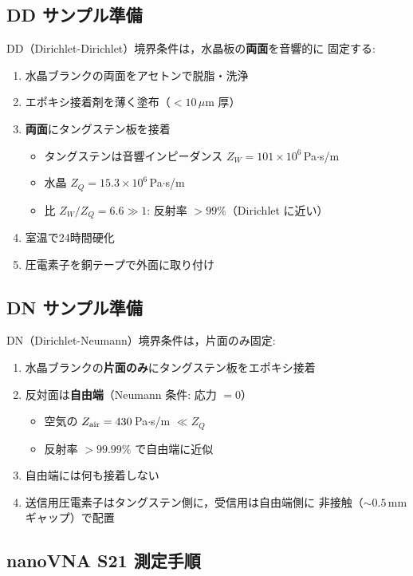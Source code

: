 \subsection{DD サンプル準備}

DD（Dirichlet-Dirichlet）境界条件は，水晶板の\textbf{両面}を音響的に
固定する:

\begin{enumerate}
\item 水晶ブランクの両面をアセトンで脱脂・洗浄
\item エポキシ接着剤を薄く塗布（$< 10\,\mu$m 厚）
\item \textbf{両面}にタングステン板を接着
  \begin{itemize}
  \item タングステンは音響インピーダンス $Z_W = 101\times10^6$\,Pa$\cdot$s/m
  \item 水晶 $Z_Q = 15.3\times10^6$\,Pa$\cdot$s/m
  \item 比 $Z_W/Z_Q = 6.6 \gg 1$: 反射率 $> 99\%$（Dirichlet に近い）
  \end{itemize}
\item 室温で24時間硬化
\item 圧電素子を銅テープで外面に取り付け
\end{enumerate}

\subsection{DN サンプル準備}

DN（Dirichlet-Neumann）境界条件は，片面のみ固定:

\begin{enumerate}
\item 水晶ブランクの\textbf{片面のみ}にタングステン板をエポキシ接着
\item 反対面は\textbf{自由端}（Neumann 条件: 応力 $= 0$）
  \begin{itemize}
  \item 空気の $Z_{\rm air} = 430$\,Pa$\cdot$s/m $\ll Z_Q$
  \item 反射率 $> 99.99\%$ で自由端に近似
  \end{itemize}
\item 自由端には何も接着しない
\item 送信用圧電素子はタングステン側に，受信用は自由端側に
  非接触（$\sim 0.5$\,mm ギャップ）で配置
\end{enumerate}

\subsection{nanoVNA S21 測定手順}

